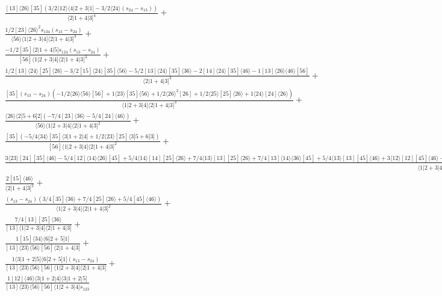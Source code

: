 \documentclass[varwidth, border=5pt]{standalone}
\begin{document}
\begin{my}
$\begin{gathered}
\scriptscriptstyle\frac{[13]⟨26⟩[35](3/2⟨12⟩⟨4|2+3|1]-3/2⟨24⟩(s_{24}-s_{13}))}{⟨2|1+4|3]^4}+\\
\scriptscriptstyle\frac{1/2[23]⟨26⟩^2s_{134}(s_{13}-s_{24})}{⟨56⟩⟨1|2+3|4]⟨2|1+4|3]^3}+\\
\scriptscriptstyle\frac{-1/2[35]⟨2|1+4|5]s_{124}(s_{13}-s_{24})}{[56]⟨1|2+3|4]⟨2|1+4|3]^3}+\\
\scriptscriptstyle\frac{1/2[13]⟨24⟩[25]⟨26⟩-3/2[15]⟨24⟩[35]⟨56⟩-5/2[13]⟨24⟩[35]⟨36⟩-2[14]⟨24⟩[35]⟨46⟩-1[13]⟨26⟩⟨46⟩[56]}{⟨2|1+4|3]^3}+\\
\scriptscriptstyle\frac{[35](s_{13}-s_{24})(-1/2⟨26⟩⟨56⟩[56]+1⟨23⟩[35]⟨56⟩+1/2⟨26⟩^2[26]+1/2⟨25⟩[25]⟨26⟩+1⟨24⟩[24]⟨26⟩)}{⟨1|2+3|4]⟨2|1+4|3]^3}+\\
\scriptscriptstyle\frac{⟨26⟩⟨2|5+6|2](-7/4[23]⟨36⟩-5/4[24]⟨46⟩)}{⟨56⟩⟨1|2+3|4]⟨2|1+4|3]^2}+\\
\scriptscriptstyle\frac{[35](-5/4⟨34⟩[35]⟨3|1+2|4]+1/2⟨23⟩[25]⟨3|5+6|3])}{[56]⟨1|2+3|4]⟨2|1+4|3]^2}+\\
\scriptscriptstyle\frac{3⟨23⟩[24][35]⟨46⟩-5/4[12]⟨14⟩⟨26⟩[45]+5/4⟨14⟩[14][25]⟨26⟩+7/4⟨13⟩[13][25]⟨26⟩+7/4[13]⟨14⟩⟨36⟩[45]+5/4⟨13⟩[13][45]⟨46⟩+3⟨12⟩[12][45]⟨46⟩-3⟨12⟩[14][25]⟨46⟩-7/4⟨14⟩[14][35]⟨36⟩+7/4⟨12⟩[12][35]⟨36⟩-7/4⟨34⟩[34][45]⟨46⟩-7/4⟨34⟩[34][35]⟨36⟩+9/4⟨23⟩[23][35]⟨36⟩+1/2[12]⟨13⟩⟨26⟩[35]}{⟨1|2+3|4]⟨2|1+4|3]^2}+\\
\scriptscriptstyle\frac{2[15]⟨46⟩}{⟨2|1+4|3]^2}+\\
\scriptscriptstyle\frac{(s_{13}-s_{24})(3/4[35]⟨36⟩+7/4[25]⟨26⟩+5/4[45]⟨46⟩)}{⟨1|2+3|4]⟨2|1+4|3]^2}+\\
\scriptscriptstyle\frac{7/4[13][25]⟨36⟩}{[13]⟨1|2+3|4]⟨2|1+4|3]}+\\
\scriptscriptstyle\frac{1[15]⟨34⟩⟨6|2+5|1]}{[13]⟨23⟩⟨56⟩[56]⟨2|1+4|3]}+\\
\scriptscriptstyle\frac{1⟨3|1+2|5]⟨6|2+5|1](s_{13}-s_{24})}{[13]⟨23⟩⟨56⟩[56]⟨1|2+3|4]⟨2|1+4|3]}+\\
\scriptscriptstyle\frac{1[12]⟨46⟩⟨3|1+2|4]⟨3|1+2|5]}{[13]⟨23⟩⟨56⟩[56]⟨1|2+3|4]s_{123}}\phantom{+}
\end{gathered}$
\end{my}
\end{document}
